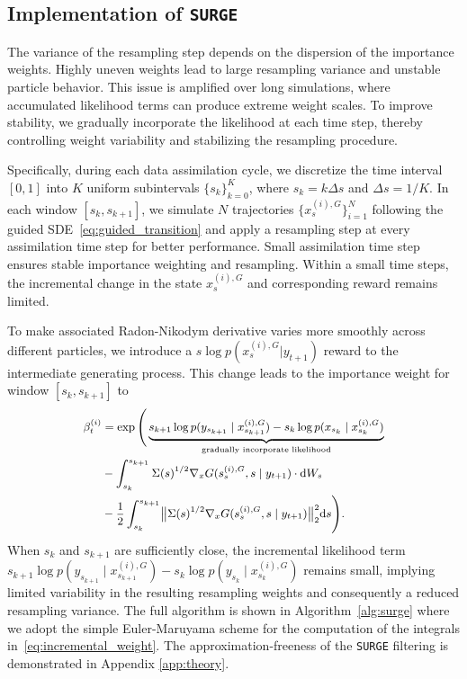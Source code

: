 \documentclass{article}
\newcommand{\dif}{{\mathrm{d}}}
\theoremstyle{plain}
\theoremstyle{definition}
\theoremstyle{remark}
\begin{document}
\subsection{Implementation of \texttt{SURGE}}

The variance of the resampling step depends on the dispersion of the
importance weights. Highly uneven weights lead to large resampling variance and unstable particle behavior. This issue is amplified over long simulations, where accumulated likelihood terms can produce extreme weight scales. To improve stability, we gradually incorporate the likelihood at each time step, thereby controlling weight variability and stabilizing the resampling procedure. 

Specifically, during each data assimilation cycle, we discretize the time interval $[0,1]$ into $K$ uniform subintervals $\{s_k\}_{k=0}^{K}$, where $s_k = k \Delta s$ and $\Delta s = 1/K$. In each window $[s_k, s_{k+1}]$, we simulate $N$ trajectories $\{x_s^{(i),G}\}_{i=1}^{N}$ following the guided SDE~\eqref{eq:guided_transition} and apply a resampling step at every assimilation time step for better performance. Small assimilation time step ensures stable importance weighting and resampling. Within a small time steps, the incremental change in the state $x_s^{(i),G}$ and corresponding reward remains limited. 

To make associated Radon-Nikodym derivative varies more smoothly across different particles, we introduce a $s \log p(x_s^{(i),G}|y_{t+1})$ reward to the intermediate generating process. This change leads to the importance weight for window $[s_k,s_{k+1}]$ to 
\begin{equation}
\label{eq:incremental_weight}
\small
\begin{aligned}
\beta_{t}^{(i)} &= \exp\Bigg(\underbrace{s_{k+1} \log p(y_{s_{k+1}} \mid x_{s_{k+1}}^{(i),G})-s_k \log p(x_{s_k} \mid x_{s_k}^{(i),G})}_{\text{gradually incorporate likelihood}} \\
&- \int_{s_k}^{s_{k+1}} \Sigma(s)^{1/2} \nabla_x G(s_s^{(i),G}, s \mid y_{t+1}) \cdot \dif W_s \\
& - \frac{1}{2} \int_{s_k}^{s_{k+1}} \bigl\| \Sigma(s)^{1/2} \nabla_x G(s_s^{(i),G}, s \mid y_{t+1}) \bigr\|_2^2 \dif s \Bigg).
\end{aligned}
\end{equation}
When $s_k$ and $s_{k+1}$ are sufficiently close, the incremental likelihood term \(
s_{k+1}\log p\left(y_{s_{k+1}} \mid x_{s_{k+1}}^{(i),G}\right)
- s_k \log p\left(y_{s_k} \mid x_{s_k}^{(i),G}\right)\) remains small, implying limited variability in the resulting resampling weights and consequently a reduced resampling variance. The full algorithm is shown in Algorithm~\ref{alg:surge} where we adopt the simple Euler-Maruyama scheme for the computation of the integrals in~\eqref{eq:incremental_weight}. The approximation-freeness of the \texttt{SURGE} filtering is demonstrated in Appendix \ref{app:theory}.
\end{document}
